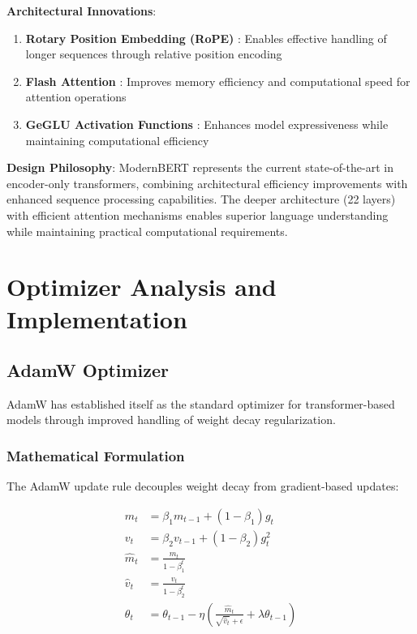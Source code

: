 \textbf{Architectural Innovations}:
\begin{enumerate}
    \item \textbf{Rotary Position Embedding (RoPE)} \cite{su2023roformerenhancedtransformerrotary}: Enables effective handling of longer sequences through relative position encoding
    \item \textbf{Flash Attention} \cite{dao2022flashattentionfastmemoryefficientexact}: Improves memory efficiency and computational speed for attention operations
    \item \textbf{GeGLU Activation Functions} \cite{shazeer2020gluvariantsimprovetransformer}: Enhances model expressiveness while maintaining computational efficiency
\end{enumerate}

\textbf{Design Philosophy}: ModernBERT represents the current state-of-the-art in encoder-only transformers, combining architectural efficiency improvements with enhanced sequence processing capabilities. The deeper architecture (22 layers) with efficient attention mechanisms enables superior language understanding while maintaining practical computational requirements.


\section{Optimizer Analysis and Implementation}

\subsection{AdamW Optimizer}

AdamW \cite{loshchilov2019decoupled} has established itself as the standard optimizer for transformer-based models through improved handling of weight decay regularization.

\subsubsection{Mathematical Formulation}

The AdamW update rule decouples weight decay from gradient-based updates:

\begin{align}
m_t &= \beta_1 m_{t-1} + (1 - \beta_1) g_t \\
v_t &= \beta_2 v_{t-1} + (1 - \beta_2) g_t^2 \\
\hat{m}_t &= \frac{m_t}{1 - \beta_1^t} \\
\hat{v}_t &= \frac{v_t}{1 - \beta_2^t} \\
\theta_t &= \theta_{t-1} - \eta \left( \frac{\hat{m}_t}{\sqrt{\hat{v}_t} + \epsilon} + \lambda \theta_{t-1} \right)
\end{align}

